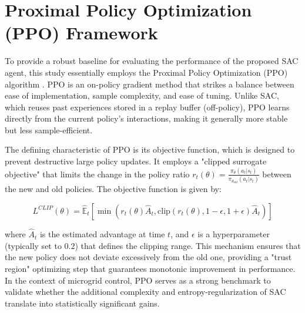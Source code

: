 
\section{Proximal Policy Optimization (PPO) Framework}

To provide a robust baseline for evaluating the performance of the proposed SAC agent, this study essentially employs the Proximal Policy Optimization (PPO) algorithm \cite{Raffin2021}. PPO is an on-policy gradient method that strikes a balance between ease of implementation, sample complexity, and ease of tuning. Unlike SAC, which reuses past experiences stored in a replay buffer (off-policy), PPO learns directly from the current policy's interactions, making it generally more stable but less sample-efficient.

The defining characteristic of PPO is its objective function, which is designed to prevent destructive large policy updates. It employs a "clipped surrogate objective" that limits the change in the policy ratio $r_t(\theta) = \frac{\pi_\theta(a_t|s_t)}{\pi_{\theta_{old}}(a_t|s_t)}$ between the new and old policies. The objective function is given by:

\begin{equation}
    L^{CLIP}(\theta) = \hat{\mathbb{E}}_t \left[ \min \left( r_t(\theta)\hat{A}_t, \text{clip}(r_t(\theta), 1-\epsilon, 1+\epsilon)\hat{A}_t \right) \right]
\end{equation}

where $\hat{A}_t$ is the estimated advantage at time $t$, and $\epsilon$ is a hyperparameter (typically set to $0.2$) that defines the clipping range. This mechanism ensures that the new policy does not deviate excessively from the old one, providing a "trust region" optimizing step that guarantees monotonic improvement in performance. In the context of microgrid control, PPO serves as a strong benchmark to validate whether the additional complexity and entropy-regularization of SAC translate into statistically significant gains.
